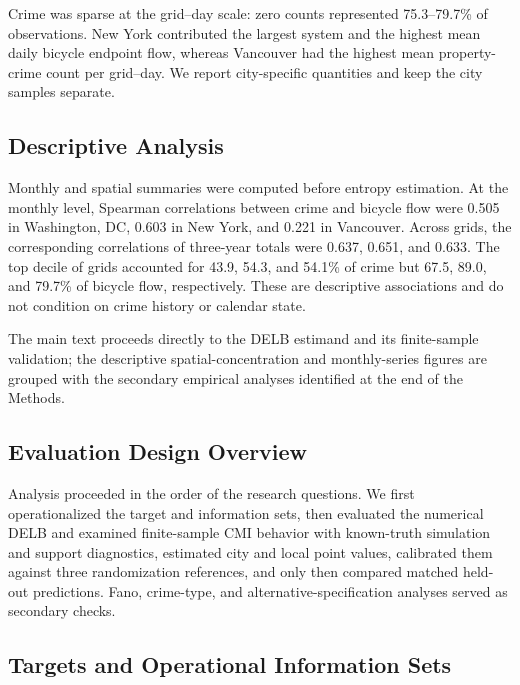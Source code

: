 Crime was sparse at the grid--day scale: zero counts represented
75.3--79.7\% of observations. New York contributed the largest system and
the highest mean daily bicycle endpoint flow, whereas Vancouver had the
highest mean property-crime count per grid--day. We report city-specific
quantities and keep the city samples separate.

\subsection{Descriptive Analysis}
\label{subsec:descriptive_analysis}

Monthly and spatial summaries were computed before entropy estimation. At
the monthly level, Spearman correlations between crime and bicycle flow
were 0.505 in Washington, DC, 0.603 in New York, and 0.221 in Vancouver.
Across grids, the corresponding correlations of three-year totals were
0.637, 0.651, and 0.633. The top decile of grids accounted for 43.9, 54.3,
and 54.1\% of crime but 67.5, 89.0, and 79.7\% of bicycle flow,
respectively. These are descriptive associations and do not condition on
crime history or calendar state.

The main text proceeds directly to the DELB estimand and its finite-sample
validation; the descriptive spatial-concentration and monthly-series figures
are grouped with the secondary empirical analyses identified at the end of
the Methods.

\subsection{Evaluation Design Overview}
\label{sec:methods}

Analysis proceeded in the order of the research questions. We first
operationalized the target and information sets, then evaluated the
numerical DELB and examined finite-sample CMI behavior with known-truth
simulation and support diagnostics, estimated city and local point values,
calibrated them against three randomization references, and only then
compared matched held-out predictions. Fano, crime-type, and
alternative-specification analyses served as secondary checks.

\subsection{Targets and Operational Information Sets}
\label{subsec:operational_information_sets}
\label{subsec:methods_information_sets}

